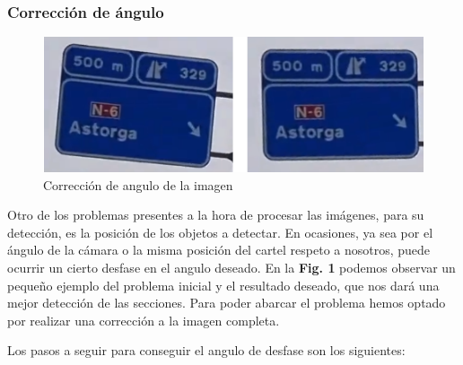 \documentclass[a4paper, 12pt]{article}
\begin{document}
\subsubsection{Corrección de ángulo}
\begin{figure}[h]
	\centering
	\includegraphics[width=0.8\linewidth]{img/norma_angulo}
	\caption{Corrección de angulo de la imagen}
	\label{fig:normaangulo}
\end{figure}

Otro de los problemas presentes a la hora de procesar las imágenes, para su detección, es la posición de los objetos a detectar. En ocasiones, ya sea por el ángulo de la cámara o la misma posición del cartel respeto a nosotros, puede ocurrir un cierto desfase en el angulo deseado. En la \textbf{Fig. 1} podemos observar un pequeño ejemplo del problema inicial y el resultado deseado, que nos dará una mejor detección de las secciones. Para poder abarcar el problema hemos optado por realizar una corrección a la imagen completa. 

Los pasos a seguir para conseguir el angulo de desfase son los siguientes:
\end{document}
